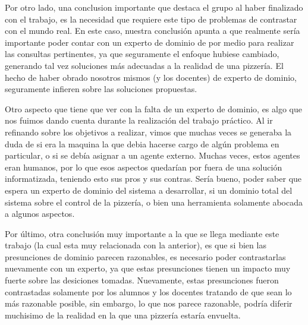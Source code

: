 \documentclass[a4paper,10pt]{article}
\begin{document}
Por otro lado, una conclusion importante que destaca el grupo al haber finalizado con el trabajo, es la necesidad que requiere este tipo de
problemas de contrastar con el mundo real. En este caso, nuestra conclusi\'on apunta a que realmente ser\'ia importante poder contar con un 
experto de dominio de por medio para realizar las consultas pertinentes, ya que seguramente el enfoque hubiese cambiado, generando tal vez soluciones
m\'as adecuadas a la realidad de una pizzer\'ia. El hecho de haber obrado nosotros mismos (y los docentes) de experto de dominio, seguramente infieren
sobre las soluciones propuestas.

Otro aspecto que tiene que ver con la falta de un experto de dominio, es algo que nos fuimos dando cuenta durante la realizaci\'on del trabajo pr\'actico.
Al ir refinando sobre los objetivos a realizar, vimos que muchas veces se generaba la duda de si era la maquina la que debia hacerse cargo de
alg\'un problema en particular, o si se deb\'ia asignar a un agente externo. Muchas veces, estos agentes eran humanos, por lo que esos aspectos
quedar\'ian por fuera de una soluci\'on informatizada, teniendo esto sus pros y sus contras. Ser\'ia bueno, poder saber que espera un experto de 
dominio del sistema a desarrollar, si un dominio total del sistema sobre el control de la pizzer\'ia, o bien una herramienta solamente abocada a algunos
aspectos.

\medskip

Por \'ultimo, otra conclusi\'on muy importante a la que se llega mediante este trabajo (la cual esta muy relacionada con la anterior), es que 
si bien las presunciones de dominio parecen razonables, es necesario poder contrastarlas nuevamente con un experto, ya que estas presunciones
tienen un impacto muy fuerte sobre las desiciones tomadas. Nuevamente, estas presunciones fueron contrastadas solamente por los alumnos y los docentes
tratando de que sean lo m\'as razonable posible, sin embargo, lo que nos parece razonable, podr\'ia diferir muchisimo de la realidad en la que 
una pizzer\'ia estar\'ia envuelta.
\end{document}

